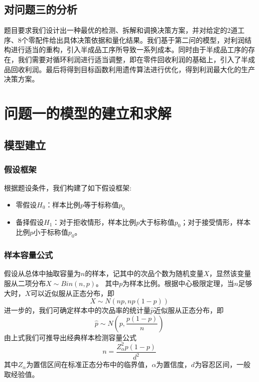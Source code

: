 \documentclass[withoutpreface,bwprint]{cumcmthesis}
\begin{document}
\subsection{对问题三的分析}
题目要求我们设计出一种最优的检测、拆解和调换决策方案，并对给定的2道工序、8个零配件给出具体决策依据和量化结果。我们基于第二问的模型，对利润结构进行适当的重构，引入半成品工序所导致一系列成本。同时由于半成品工序的存在，我们需要对循环利润进行适当调整，即在零件回收利润的基础上，引入了半成品回收利润。最后将得到目标函数利用遗传算法进行优化，得到利润最大化的生产决策方案。

\newpage
\newpage
\section{问题一的模型的建立和求解}
\subsection{模型建立}
\subsubsection{假设框架}
根据题设条件，我们构建了如下假设框架:
\begin{itemize}
   \item 零假设$H_0$：样本比例$p$等于标称值$p_0$
   \item 备择假设$H_1$：对于拒收情形，样本比例$p$大于标称值$p_0$；对于接受情形，样本比例$p$小于标称值$p_0$。
\end{itemize}
\subsubsection{样本容量公式}
假设从总体中抽取容量为$n$的样本，记其中的次品个数为随机变量$X$，显然该变量服从二项分布$X \sim Bin(n,p)$。
其中$p$为样本比例。根据中心极限定理，当$n$足够大时，$X$可以近似服从正态分布，即\begin{equation}
X\sim N(np,np(1-p))
\end{equation}
进一步的，我们可确定样本中的次品率的统计量$\hat{p}$近似服从正态分布，即
\begin{equation}
\hat{p}\sim N(p,\frac{p(1-p)}{n})
\end{equation}
由上式我们可推导出经典样本检测容量公式
\begin{equation}
n=\frac{Z^2_{\alpha}p(1-p)}{d^2}
\end{equation}
其中$Z_{\alpha}$为置信区间在标准正态分布中的临界值，$\alpha$为置信度，$d$为容忍区间，一般取经验值。
\end{document}

